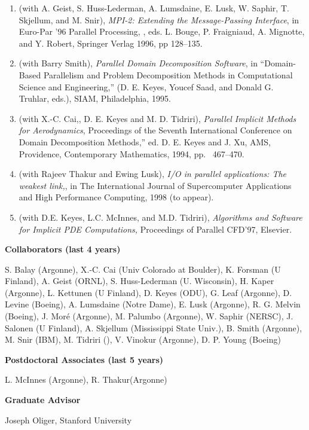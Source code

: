 \begin{enumerate}
\item
(with A. Geist, S. Huss-Lederman, A. Lumsdaine, E. Lusk, 
W. Saphir, T. Skjellum, and M. Snir), {\em {MPI}-2:  Extending
 the
Message-Passing Interface}, in Euro-Par '96 Parallel Processing, , eds. 
L. Bouge, P. Fraigniaud, A. Mignotte, and Y. Robert, Springer
Verlag 1996, pp 128--135.

\item 
(with Barry Smith), {\em Parallel Domain Decomposition
Software}, in ``Domain-Based Parallelism and Problem Decomposition Methods
 in
Computational Science and Engineering,'' (D. E. Keyes, Youcef Saad, and
 Donald
G. Truhlar, eds.), SIAM, Philadelphia, 1995.

\item 
(with X.-C. Cai,, D. E. Keyes and M. D. Tidriri), {\it Parallel
Implicit Methods for Aerodynamics},
Proceedings of the Seventh International Conference on Domain
Decomposition Methods,'' ed. D. E. Keyes and J. Xu, AMS,
 Providence,
Contemporary Mathematics, 1994, pp. ~467--470.

\item
(with Rajeev Thakur and Ewing Lusk), {\em I/O in parallel applications: The
  weakest link,}, in  The International Journal of Supercomputer
 Applications
and High   Performance Computing, 1998 (to appear).

\item
(with D.E. Keyes, L.C. McInnes, and M.D. Tidriri), {\em Algorithms
 and
Software for Implicit PDE Computations,} Proceedings of Parallel 
CFD'97, Elsevier.


\end{enumerate}
\bigskip\noindent
{\bf Collaborators (last 4 years)}

\bigskip\noindent

S. Balay (Argonne), X.-C. Cai (Univ Colorado at Boulder), K. Forsman
 (U
Finland), A.  Geist (ORNL), S. Huss-Lederman (U. Wisconsin), H.
 Kaper
(Argonne), L. Kettunen (U Finland), D. Keyes (ODU), G.  Leaf (Argonne),
 D.
Levine (Boeing), A. Lumsdaine (Notre Dame), E. Lusk (Argonne), R. G.
 Melvin
(Boeing), J. Mor\'e (Argonne), M. Palumbo (Argonne), W. Saphir (NERSC),
 J.
Salonen (U Finland), A.  Skjellum (Mississippi State Univ.), B.
 Smith
(Argonne), M. Snir (IBM), M. Tidriri (), V. Vinokur (Argonne), D. P.
 Young
(Boeing)

\bigskip\noindent
{\bf Postdoctoral Associates (last 5 years) }

\bigskip\noindent
L. McInnes (Argonne), R. Thakur(Argonne)

\bigskip\noindent
{\bf Graduate Advisor}

Joseph Oliger, Stanford University




